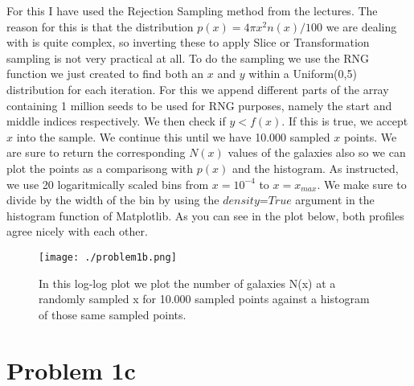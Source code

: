 \newpage
For this I have used the Rejection Sampling method from the lectures. The reason for this is that the distribution $p(x) = 4\pi x^2 n(x)/100$ we are dealing with is quite complex, so inverting these to apply Slice or Transformation sampling is not very practical at all. To do the sampling we use the RNG function we just created to find both an $x$ and $y$ within a Uniform(0,5) distribution for each iteration. For this we append different parts of the array containing 1 million seeds to be used for RNG purposes, namely the start and middle indices respectively. We then check if $y < f(x)$. If this is true, we accept $x$ into the sample. We continue this until we have 10.000 sampled $x$ points. We are sure to return the corresponding $N(x)$ values of the galaxies also so we can plot the points as a comparisong with $p(x)$ and the histogram. As instructed, we use 20 logaritmically scaled bins from $x = 10^{-4}$ to $x = x_{max}$. We make sure to divide by the width of the bin by using the $\textit{density=True}$ argument in the histogram function of Matplotlib. As you can see in the plot below, both profiles agree nicely with each other. 

\begin{figure}[h!]
  \centering
  \texttt{[image: ./problem1b.png]}
  \caption{In this log-log plot we plot the number of galaxies N(x) at a randomly sampled x for 10.000 sampled points against a histogram of those same sampled points.}
\end{figure}

\newpage
\section*{Problem 1c}


